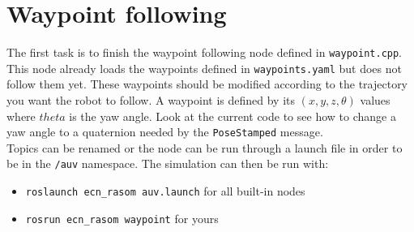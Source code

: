 \documentclass{ecnreport}
\begin{document}
\section{Waypoint following}

The first task is to finish the waypoint following node defined in \texttt{waypoint.cpp}. This node already loads the waypoints defined in \texttt{waypoints.yaml} but does not follow them yet.
These waypoints should be modified according to the trajectory you want the robot to follow. A waypoint is defined by its $(x,y,z,\theta)$ values where $theta$ is the yaw angle. Look at the current
code to see how to change a yaw angle to a quaternion needed by the \texttt{PoseStamped} message.\\

Topics can be renamed or the node can be run through a launch file in order to be in the \texttt{/auv} namespace.
The simulation can then be run with:
\begin{itemize}
 \item \texttt{roslaunch ecn\_rasom auv.launch} for all built-in nodes
 \item \texttt{rosrun ecn\_rasom waypoint} for yours
\end{itemize}
\end{document}
